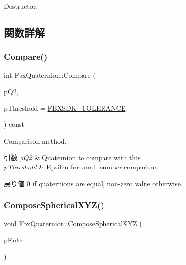 Destructor. 



\subsection{関数詳解}
\mbox{\label{class_fbx_quaternion_a6e2200de81315f788b0bf80d553f1f65}} 
\subsubsection{\texorpdfstring{Compare()}{Compare()}}
{\footnotesize\ttfamily int Fbx\+Quaternion\+::\+Compare (\begin{DoxyParamCaption}\item[{const \hyperlink{class_fbx_quaternion}{Fbx\+Quaternion} \&}]{p\+Q2,  }\item[{const double}]{p\+Threshold = {\ttfamily \hyperlink{fbxtypes_8h_acf3cd6f208edb42ad9c9abbc1f7feea0}{F\+B\+X\+S\+D\+K\+\_\+\+T\+O\+L\+E\+R\+A\+N\+CE}} }\end{DoxyParamCaption}) const}

Comparison method. 
\begin{DoxyParams}{引数}
{\em p\+Q2} & Quaternion to compare with this \\
\hline
{\em p\+Threshold} & Epsilon for small number comparison \\
\hline
\end{DoxyParams}
\begin{DoxyReturn}{戻り値}
0 if quaternions are equal, non-\/zero value otherwise. 
\end{DoxyReturn}
\mbox{\label{class_fbx_quaternion_a226f76a65db79665179df625f8c57c2d}} 
\subsubsection{\texorpdfstring{Compose\+Spherical\+X\+Y\+Z()}{ComposeSphericalXYZ()}}
{\footnotesize\ttfamily void Fbx\+Quaternion\+::\+Compose\+Spherical\+X\+YZ (\begin{DoxyParamCaption}\item[{const \hyperlink{class_fbx_vector4}{Fbx\+Vector4}}]{p\+Euler }\end{DoxyParamCaption})}

